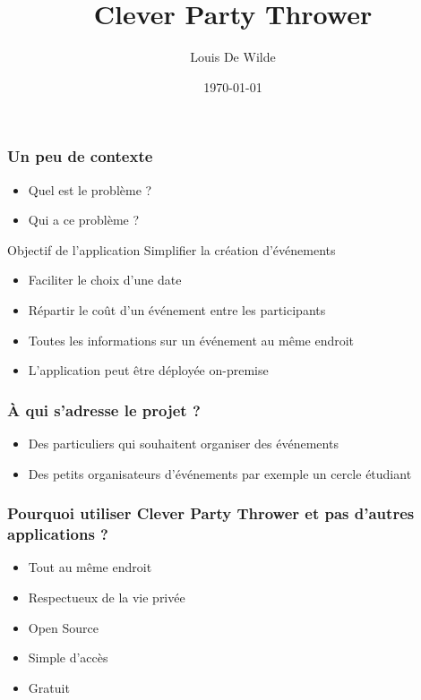 \documentclass[aspectratio=169]{beamer}
\title{Clever Party Thrower}
\author{Louis De Wilde}
\date{\today}
\begin{document}
    \frame{\titlepage}
    \begin{frame}
        \frametitle{Un peu de contexte}
        \begin{itemize}
            \item Quel est le problème ?
            \item Qui a ce problème ?
        \end{itemize}
        Objectif de l'application
        Simplifier la création d'événements
        \begin{itemize}
            \item Faciliter le choix d'une date
            \item Répartir le coût d'un événement entre les participants
            \item Toutes les informations sur un événement au même endroit
            \item L'application peut être déployée on-premise
        \end{itemize}
    \end{frame}

    \begin{frame}
        \frametitle{À qui s'adresse le projet ?}
        \begin{itemize}
            \item Des particuliers qui souhaitent organiser des événements
            \item Des petits organisateurs d'événements par exemple un cercle étudiant
        \end{itemize}
    \end{frame}

    \begin{frame}
        \frametitle{Pourquoi utiliser Clever Party Thrower et pas d'autres applications ?}
        \begin{itemize}
            \item Tout au même endroit
            \item Respectueux de la vie privée
            \item Open Source
            \item Simple d'accès
            \item Gratuit
        \end{itemize}
    \end{frame}
\end{document}
